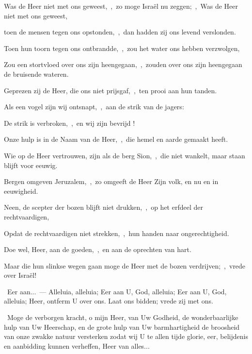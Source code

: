 \documentclass[12pt,twoside,a5paper]{article}
\begin{document}

\begin{halfparskip}

  Was de Heer niet met ons geweest,~\sep\ zo moge Israël nu zeggen;~\sep\ Was de Heer niet met ons geweest,

  toen de mensen tegen ons opstonden,~\sep\ dan hadden zij ons levend verslonden.

  Toen hun toorn tegen ons ontbrandde,~\sep\ zou het water ons hebben verzwolgen,

  Zou een stortvloed over ons zijn heengegaan,~\sep\ zouden over ons zijn heengegaan de bruisende wateren.
\end{halfparskip}

\begin{halfparskip}

  Geprezen zij de Heer, die ons niet prijsgaf,~\sep\ ten prooi aan hun tanden.

  Als een vogel zijn wij ontsnapt,~\sep\ aan de strik van de jagers:

  De strik is verbroken,~\sep\ en wij zijn bevrijd !

  Onze hulp is in de Naam van de Heer,~\sep\ die hemel en aarde gemaakt heeft.
\end{halfparskip}


\begin{halfparskip}
  Wie op de Heer vertrouwen, zijn als de berg Sion,~\sep\ die niet wankelt, maar staan blijft voor eeuwig.

  Bergen omgeven Jeruzalem,~\sep\ zo omgeeft de Heer Zijn volk, en nu en in eeuwigheid.

  Neen, de scepter der bozen blijft niet drukken,~\sep\ op het erfdeel der rechtvaardigen,

  Opdat de rechtvaardigen niet strekken,~\sep\ hun handen naar ongerechtigheid.

  Doe wel, Heer, aan de goeden,~\sep\ en aan de oprechten van hart.

  Maar die hun slinkse wegen gaan moge de Heer met de bozen verdrijven;~\sep\ vrede over Israël!
\end{halfparskip}

\begin{halfparskip}
  \dd~Eer aan...~--- Alleluia, alleluia; Eer aan U, God, alleluia; Eer aan U, God, alleluia; Heer, ontferm U over ons. Laat ons bidden; vrede zij met ons.

  \cc~Moge de verborgen kracht, o mijn Heer, van Uw Godheid, de wonderbaarlijke hulp van Uw Heerschap, en de grote hulp van Uw barmhartigheid de broosheid van onze zwakke natuur versterken zodat wij U te allen tijde glorie, eer, belijdenis en aanbidding kunnen verheffen, Heer van alles...
\end{halfparskip}
\end{document}
